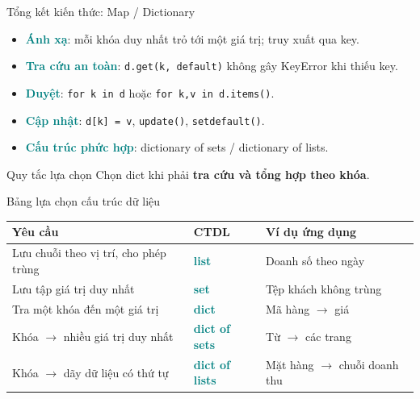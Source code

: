 \documentclass[aspectratio=169,10pt]{beamer}
\newcommand{\term}[1]{\textcolor{teal}{\textbf{#1}}}
\newcommand{\py}[1]{{\color{deepnavy}\texttt{#1}}}
\begin{document}
\begin{frame}[t]{Tổng kết kiến thức: Map / Dictionary}

\begin{itemize}
\item \term{Ánh xạ}: mỗi khóa duy nhất trỏ tới một giá trị; truy xuất qua key.
\item \term{Tra cứu an toàn}: \py{d.get(k, default)} không gây KeyError khi thiếu key.
\item \term{Duyệt}: \py{for k in d} hoặc \py{for k,v in d.items()}.
\item \term{Cập nhật}: \py{d[k] = v}, \py{update()}, \py{setdefault()}.
\item \term{Cấu trúc phức hợp}: dictionary of sets / dictionary of lists.
\end{itemize}
\begin{block}{Quy tắc lựa chọn} Chọn dict khi phải \textbf{tra cứu và tổng hợp theo khóa}. \end{block}

\end{frame}

\begin{frame}[t]{Bảng lựa chọn cấu trúc dữ liệu}

\small
\begin{tabularx}{\linewidth}{p{4.7cm} X p{4.0cm}}
\toprule
\textbf{Yêu cầu} & \textbf{CTDL} & \textbf{Ví dụ ứng dụng}\\\midrule
Lưu chuỗi theo vị trí, cho phép trùng & \term{list} & Doanh số theo ngày\\\midrule
Lưu tập giá trị duy nhất & \term{set} & Tệp khách không trùng\\\midrule
Tra một khóa đến một giá trị & \term{dict} & Mã hàng $\to$ giá\\\midrule
Khóa $\to$ nhiều giá trị duy nhất & \term{dict of sets} & Từ $\to$ các trang\\\midrule
Khóa $\to$ dãy dữ liệu có thứ tự & \term{dict of lists} & Mặt hàng $\to$ chuỗi doanh thu\\
\bottomrule
\end{tabularx}

\end{frame}
\end{document}
